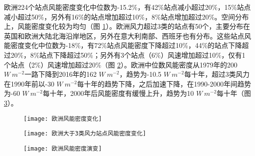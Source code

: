 欧洲224个站点风能密度变化中位数为-15.2\%，有42\%站点减小超过20\%，15\%站点减小超过50\%，另外有16\%的站点增加超过10\%，8\%站点增加超过20\%。空间分布上，风能密度变化较为均匀（图 \ref{fig:EUwindpowerchange}）。欧洲风力超过3类的站点有50个，主要分布在英国和欧洲大陆北海沿岸地区，另外在意大利南部、西班牙也有分布。这些站点风能密度变化中位数为-18\%，有72\%站点风能密度下降超过10\%，44\%的站点下降超过20\%，8\%站点下降超过50\%；另外有3个站点（6\%）风速增加超过10\%，仅有1个站点（2\%）风速增加超过20\%（图 \ref{fig:EUwindpowerchangeover3}）。欧洲中位数风能密度从1979年的200 $W ~ m^{-2}$一路下降到2016年的162 $W ~ m^{-2}$，趋势为-10.5 $W ~ m^{-2}$每十年，超过3类风力在1990年前以-30 $W ~ m^{-2}$每十年的趋势下降，之后加速下降，在1990-2000年间趋势为-60 $W ~ m^{-2}$每十年，2000年后风能密度有缓慢上升，趋势为10 $W ~ m^{-2}$每十年（图 \ref{fig:EUwindpowerevolution}）。

\begin{figure}[!htbp]
    \centering
     \texttt{[image: 欧洲风能密度变化]}
    \label{fig:EUwindpowerchange}
\end{figure}

\begin{figure}[!htbp]
    \centering
     \texttt{[image: 欧洲大于3类风力站点风能密度变化]}
    \label{fig:EUwindpowerchangeover3}
\end{figure}

\begin{figure}[!htbp]
    \centering
     \texttt{[image: 欧洲风能密度演变]}
    \label{fig:EUwindpowerevolution}
\end{figure}

